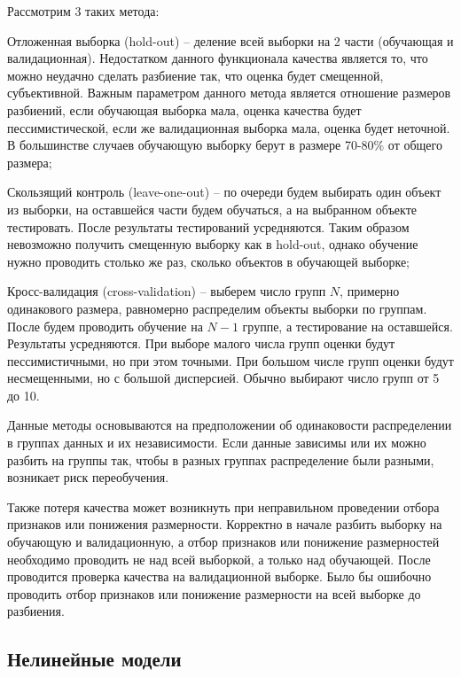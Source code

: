 Рассмотрим 3 таких метода:
\begin{description}[font=$\bullet$]
    \item Отложенная выборка (hold-out) -- деление всей выборки на 2 части (обучающая и валидационная). Недостатком данного функционала качества является то, что можно неудачно сделать разбиение так, что оценка будет смещенной, субъективной. Важным параметром данного метода является отношение размеров разбиений, если обучающая выборка мала, оценка качества будет пессимистической, если же валидационная выборка мала, оценка будет неточной. В большинстве случаев обучающую выборку берут в размере 70-80\% от общего размера;
    \item Скользящий контроль (leave-one-out) -- по очереди будем выбирать один объект из выборки, на оставшейся части будем обучаться, а на выбранном объекте тестировать. После результаты тестирований усредняются. Таким образом невозможно получить смещенную выборку как в hold-out, однако обучение нужно проводить столько же раз, сколько объектов в обучающей выборке;
    \item Кросс-валидация (cross-validation) -- выберем число групп $N$, примерно одинакового размера, равномерно распределим объекты выборки по группам. После будем проводить обучение на $N-1$ группе, а тестирование на оставшейся. Результаты усредняются. При выборе малого числа групп оценки будут пессимистичными, но при этом точными. При большом числе групп оценки будут несмещенными, но с большой дисперсией. Обычно выбирают число групп от 5 до 10.
\end{description}
Данные методы основываются на предположении об одинаковости распределении в группах данных и их независимости. Если данные зависимы или их можно разбить на группы так, чтобы в разных группах распределение были разными, возникает риск переобучения.

Также потеря качества может возникнуть при неправильном проведении отбора признаков или понижения размерности. Корректно в начале разбить выборку на обучающую и валидационную, а отбор признаков или понижение размерностей необходимо проводить не над всей выборкой, а только над обучающей. После проводится проверка качества на валидационной выборке. Было бы ошибочно проводить отбор признаков или понижение размерности на всей выборке до разбиения.


\subsection{Нелинейные модели}

